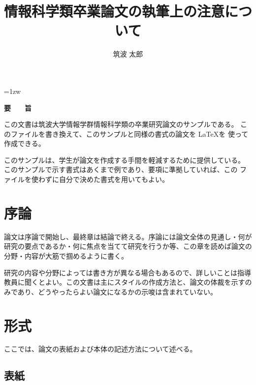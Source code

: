 \documentclass[a4paper,11pt]{jreport}
\title{情報科学類卒業論文の執筆上の注意について}
\author{筑波 太郎}
\begin{document}
\maketitle
\thispagestyle{empty}
\newpage

\thispagestyle{empty}
\vspace*{20pt plus 1fil}
\parindent=1zw
\noindent
\begin{center}
{\Large \bf 要　　旨}
\vspace{2cm}
\end{center}
この文書は筑波大学情報学群情報科学類の卒業研究論文のサンプルである。
このファイルを書き換えて、このサンプルと同様の書式の論文を \LaTeX を
使って作成できる。

このサンプルは、学生が論文を作成する手間を軽減するために提供している。
このサンプルで示す書式はあくまで例であり、要項に準拠していれば、この
ファイルを使わずに自分で決めた書式を用いてもよい。

\par
\vspace{0pt plus 1fil}
\newpage

\tableofcontents
\listoffigures

\pagebreak \setcounter{page}{1}

\chapter{序論}

論文は序論で開始し、最終章は結論で終える。序論には論文全体の見通し・何が
研究の要点であるか・何に焦点を当てて研究を行うか等、この章を読めば論文の
分野・内容が大筋で掴めるように書く。

研究の内容や分野によっては書き方が異なる場合もあるので、詳しいことは指導
教員に聞くとよい。この文書は主にスタイルの作成方法と、論文の体裁を示すの
みであり、どうやったらよい論文になるかの示唆は含まれていない。

\chapter{形式}

ここでは、論文の表紙および本体の記述方法について述べる。

\section{表紙}
\end{document}
